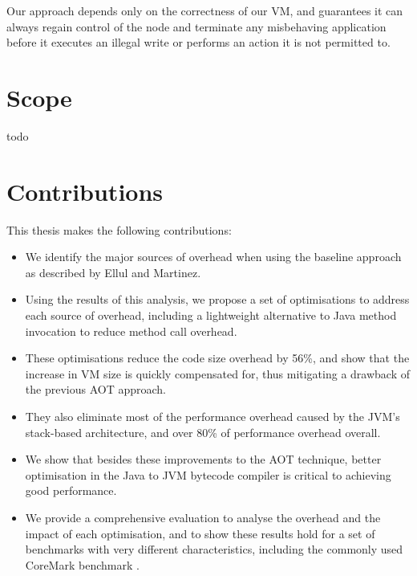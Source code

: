 Our approach depends only on the correctness of our VM, and guarantees it can always regain control of the node and terminate any misbehaving application before it executes an illegal write or performs an action it is not permitted to.


\section{Scope}
todo




\section{Contributions}

This thesis makes the following contributions:
\begin{itemize}
	\item We identify the major sources of overhead when using the baseline approach as described by Ellul and Martinez.
	\item Using the results of this analysis, we propose a set of optimisations to address each source of overhead, including a lightweight alternative to Java method invocation to reduce method call overhead.
	\item These optimisations reduce the code size overhead by 56\%, and show that the increase in VM size is quickly compensated for, thus mitigating a drawback of the previous AOT approach.
	\item They also eliminate most of the performance overhead caused by the JVM's stack-based architecture, and over 80\% of performance overhead overall.
	\item We show that besides these improvements to the AOT technique, better optimisation in the Java to JVM bytecode compiler is critical to achieving good performance.
	\item We provide a comprehensive evaluation to analyse the overhead and the impact of each optimisation, and to show these results hold for a set of benchmarks with very different characteristics, including the commonly used CoreMark benchmark \cite{coremark}.
\end{itemize}

